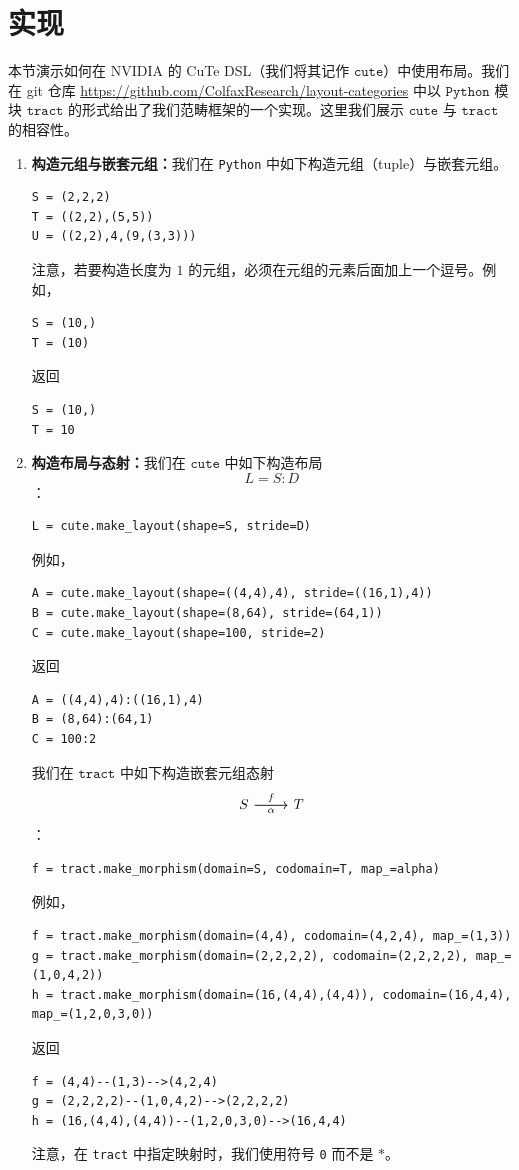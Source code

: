 \clearpage

\section{实现} \label{implementationsection}
本节演示如何在 NVIDIA 的 CuTe DSL（我们将其记作 $\texttt{cute}$）中使用布局。我们在 git 仓库 \url{https://github.com/ColfaxResearch/layout-categories} 中以 $\texttt{Python}$ 模块 $\texttt{tract}$ 的形式给出了我们范畴框架的一个实现。这里我们展示 $\texttt{cute}$ 与 $\texttt{tract}$ 的相容性。

\begin{enumerate}[left=0pt]
\item {\bf 构造元组与嵌套元组：}我们在 \texttt{Python} 中如下构造元组（tuple）与嵌套元组。 
\begin{lstlisting}[language=cutedsl]
S = (2,2,2)
T = ((2,2),(5,5))
U = ((2,2),4,(9,(3,3)))
\end{lstlisting}
注意，若要构造长度为 $1$ 的元组，必须在元组的元素后面加上一个逗号。例如，
\begin{lstlisting}[language=cutedsl]
S = (10,)
T = (10)
\end{lstlisting}
返回
\begin{lstlisting}[language=cutedsl]
S = (10,)
T = 10
\end{lstlisting}
\item {\bf 构造布局与态射：}我们在 $\texttt{cute}$ 中如下构造布局
\[
L = S:D
\]
：
\begin{lstlisting}[language=cutedsl]
L = cute.make_layout(shape=S, stride=D)
\end{lstlisting}
例如，
\begin{lstlisting}[language=cutedsl]
A = cute.make_layout(shape=((4,4),4), stride=((16,1),4))
B = cute.make_layout(shape=(8,64), stride=(64,1))
C = cute.make_layout(shape=100, stride=2)
\end{lstlisting}
返回
\begin{lstlisting}[language=cutedsl]
A = ((4,4),4):((16,1),4)
B = (8,64):(64,1)
C = 100:2
\end{lstlisting}
我们在 $\texttt{tract}$ 中如下构造嵌套元组态射
\[\begin{tikzcd} 
S \ar[r,"f"] \ar[r,swap,"\alpha"] & T
\end{tikzcd} \]
：
\begin{lstlisting}[language=cutedsl]
f = tract.make_morphism(domain=S, codomain=T, map_=alpha)
\end{lstlisting}
例如，
\begin{lstlisting}[language=cutedsl]
f = tract.make_morphism(domain=(4,4), codomain=(4,2,4), map_=(1,3))
g = tract.make_morphism(domain=(2,2,2,2), codomain=(2,2,2,2), map_=(1,0,4,2))
h = tract.make_morphism(domain=(16,(4,4),(4,4)), codomain=(16,4,4), map_=(1,2,0,3,0))
\end{lstlisting}
返回
\begin{lstlisting}[language=cutedsl]
f = (4,4)--(1,3)-->(4,2,4)
g = (2,2,2,2)--(1,0,4,2)-->(2,2,2,2)
h = (16,(4,4),(4,4))--(1,2,0,3,0)-->(16,4,4)
\end{lstlisting}
注意，在 \texttt{tract} 中指定映射时，我们使用符号 \texttt{0} 而不是 $\ast$。


\end{enumerate}

